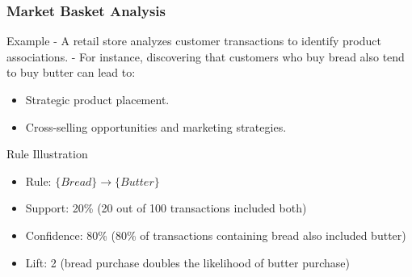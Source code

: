 \documentclass[aspectratio=169]{beamer}
\begin{document}
\begin{frame}[fragile]
    \frametitle{Market Basket Analysis}
    \begin{block}{Example}
        - A retail store analyzes customer transactions to identify product associations.
        - For instance, discovering that customers who buy bread also tend to buy butter can lead to:
        \begin{itemize}
            \item Strategic product placement.
            \item Cross-selling opportunities and marketing strategies.
        \end{itemize}
    \end{block}
    \begin{block}{Rule Illustration}
        \begin{itemize}
            \item Rule: $\{Bread\} \rightarrow \{Butter\}$
            \item Support: 20\% (20 out of 100 transactions included both)
            \item Confidence: 80\% (80\% of transactions containing bread also included butter)
            \item Lift: 2 (bread purchase doubles the likelihood of butter purchase)
        \end{itemize}
    \end{block}
\end{frame}
\end{document}
